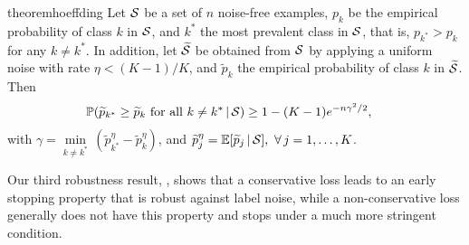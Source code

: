 \documentclass[letterpaper]{article} %
\newcommand{\Em}{{\mathbb{E}}}
\newcommand{\Pm}{{\mathbb{P}}}
\newcommand{\bx}{{\bm{x}}}
\newcommand{\by}{{\bm{y}}}
\newcommand{\gvn}{\,|\,}
\newcommand{\cS}{{\cal{S}}}
\begin{document}
\begin{restatable}[]{theorem}{hoeffding} \label{thm:hoeffding}
	Let $\cS$ be a set of $n$ noise-free examples, $p_{k}$ be the empirical
	probability of class $k$ in $\cS$, and $k^*$ the most prevalent class in
	$\cS$, that is, $p_{k^*}>p_{k}$ for any $k\ne k^*$.
	In addition, let $\widetilde{\cS}$ be obtained from $\cS$ by applying a
	uniform noise with rate $\eta < (K-1)/K$, and $\widetilde{p}_k$ the empirical
	probability of class $k$ in $\widetilde{\cS}$. 
	Then
	\begin{align*}
		\Pm(\widetilde{p}_{k^*}\geq \widetilde{p}_{k} \text{ for all $k \neq k^{*}$}
		\gvn \cS) 
		&\geq 1-(K-1) e^{-n\gamma^2/2},
	\end{align*}
	with 
	$\gamma = \underset{k\ne k^*}{\min}\,(\widetilde{p}_{k^*}^{\eta} - \widetilde{p}_{k}^{\eta})$,
	and 
	$\widetilde{p}_{j}^{\eta}=\Em [\widetilde{p}_j\gvn \cS],\ \forall\,j=1,\ldots,K$.
\end{restatable}






Our third robustness result, , shows that a
conservative loss leads to an early stopping property that is robust against
label noise, while a non-conservative loss generally does not have this
property and stops under a much more stringent condition.
\end{document}
